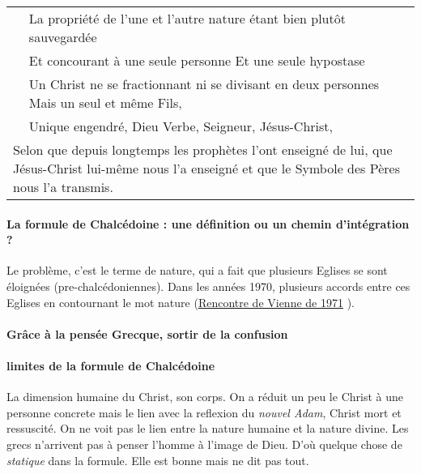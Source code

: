 \begin{table}[h!]
\begin{tabular}{p{}p{}p{}}
                                                                       & La propriété de l’une et l’autre nature étant bien plutôt sauvegardée                    &                                                                      \\
                                                                       & Et concourant à une seule personne Et une seule hypostase                                &                                                                      \\
                                                                       & Un Christ ne se fractionnant ni se divisant en deux personnes Mais un seul et même Fils, &                                                                      \\
                                                                       & Unique engendré, Dieu Verbe, Seigneur, Jésus-Christ,                                     &                                                                      \\
\multicolumn{3}{p{\textwidth}}{Selon que depuis longtemps les prophètes l’ont enseigné de lui, que Jésus-Christ lui-même nous l’a enseigné et que le Symbole des Pères nous l’a transmis.}                                                          
\end{tabular}
\end{table}

  
  \paragraph{La formule de Chalcédoine : une définition ou un chemin
    d'intégration ?
  }
 
  Le problème, c'est le terme de nature, qui a fait que plusieurs Eglises se sont éloignées (pre-chalcédoniennes). Dans les années 1970, plusieurs accords entre ces Eglises en contournant le mot nature (\href{https://www.cairn.info/revue-etudes-theologiques-et-religieuses-2006-1-page-53.htm}{Rencontre de Vienne de 1971} ).
  
  
  \paragraph{Grâce à la pensée Grecque, sortir de la confusion} 
  \paragraph{limites de la formule de Chalcédoine} La dimension humaine du Christ, son corps. On a réduit un peu le Christ à une personne concrete mais le lien avec la reflexion du \textit{nouvel Adam}, Christ mort et ressuscité. On ne voit pas le lien entre la nature humaine et la nature divine.  Les grecs n'arrivent pas à penser l'homme à l'image de Dieu. D'où quelque chose de \textit{statique} dans la formule. Elle est bonne mais ne dit pas tout. 






